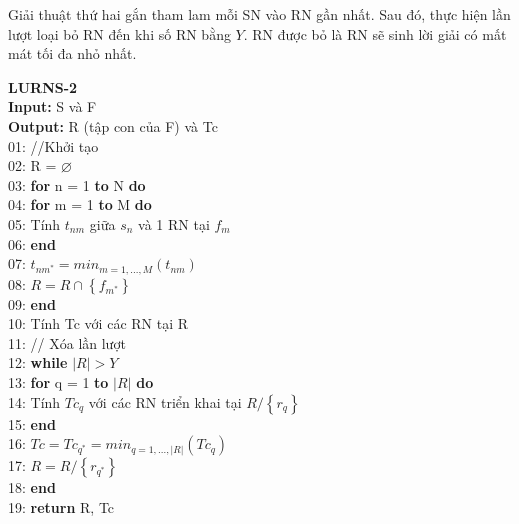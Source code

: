 \documentclass[hidelinks, 11pt, a4paper]{report}
\newenvironment{codeb}{\code}{\par}
\begin{document}
Giải thuật thứ hai gắn tham lam mỗi SN vào RN gần nhất. Sau đó, thực hiện lần lượt loại bỏ RN đến khi số RN bằng $Y$. RN được bỏ là RN sẽ sinh lời giải có mất mát tối đa nhỏ nhất.

\textbf{LURNS-2}\\
\begin{codeb}
    \textbf{Input: }S và F\\
    \textbf{Output: }R (tập con của F) và Tc\\
    01: //Khởi tạo\\
    02: R = $\varnothing$\\
    03: \textbf{for} n = 1 \textbf{to} N \textbf{do}\\
    04: \hspace{2mm}\textbf{for} m = 1 \textbf{to} M \textbf{do}\\
    05: \hspace{4mm}Tính $t_{nm}$ giữa $s_n$ và 1 RN tại $f_m$\\
    06: \hspace{2mm}\textbf{end}\\
    07: \hspace{2mm}$t_{nm^*} = min_{m=1,...,M}(t_{nm})$\\
    08: \hspace{2mm}$R = R\cap \left\{f_{m^*}\right\}$\\
    09: \textbf{end}\\
    10: Tính Tc với các RN tại R\\
    11: // Xóa lần lượt\\
    12: \textbf{while} $|R|>Y$\\
    13: \hspace{2mm}\textbf{for} q = 1 \textbf{to} $|R|$ \textbf{do}\\
    14: \hspace{4mm}Tính $Tc_q$ với các RN triển khai tại $R/\left\{r_q\right\}$\\
    15: \hspace{2mm}\textbf{end}\\
    16: \hspace{2mm}$Tc = Tc_{q^*} = min_{q=1,...,|R|}(Tc_q)$\\
    17: \hspace{2mm}$R = R/\left\{r_{q^*}\right\}$\\
    18: \textbf{end}\\
    19: \textbf{return} R, Tc\\
\end{codeb}
\end{document}
